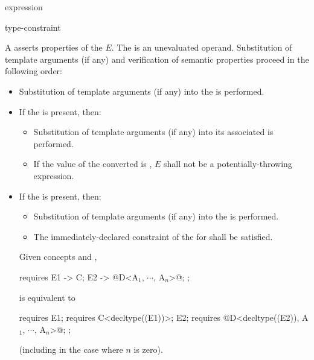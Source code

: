 \begin{bnf}
\br
    \terminal{\{} expression \terminal{\}}   \terminal{;}
\end{bnf}

\begin{bnf}
\br
    \terminal{->} type-constraint
\end{bnf}

\pnum
A  asserts properties
of the  $E$.
The  is an unevaluated operand.
Substitution
of template arguments (if any) and verification of
semantic properties proceed in the following order:

\begin{itemize}
\item
Substitution of template arguments (if any)
into the  is performed.

\item
If the  is present, then:
\begin{itemize}
\item
Substitution of template arguments (if any)
into its associated  is performed.
\item
If the value of the converted  is ,
$E$ shall not be a potentially-throwing expression.
\end{itemize}

\item
If the  is present, then:

\begin{itemize}
\item
Substitution of template arguments (if any)
into the  is performed.

\item
The immediately-declared constraint
of the  for 
shall be satisfied.
\end{itemize}
\begin{example}
Given concepts  and ,
\begin{codeblock}
requires {
  { E1 } -> C;
  { E2 } -> @D<A$_1$, $\cdots$, A$_n$>@;
};
\end{codeblock}
is equivalent to
\begin{codeblock}
requires {
  E1; requires C<decltype((E1))>;
  E2; requires @D<decltype((E2)), A$_1$, $\cdots$, A$_n$>@;
};
\end{codeblock}
(including in the case where $n$ is zero).
\end{example}
\end{itemize}
